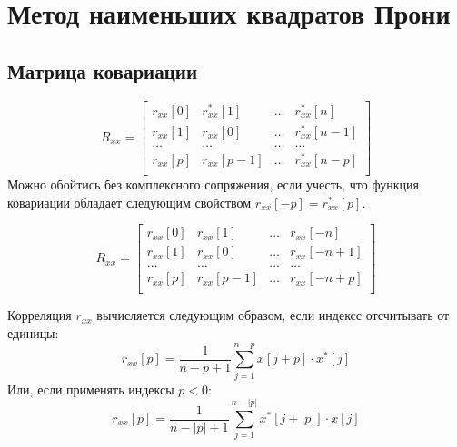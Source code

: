 \documentclass[a4paper,14pt]{extarticle}
\begin{document}
\section{Метод наименьших квадратов Прони}%
\label{sec:metod_naimen_shikh_kvadratov_proni}
\subsection{Матрица ковариации}%
\label{sub:matritsa_kovariatsii}

\begin{equation}
    \label{eq:Rxx1}
    R_{xx} = 
        \begin{bmatrix}
            r_{xx}[0] & r_{xx}^*[1] & \dots &  r_{xx}^*[n] \\
            r_{xx}[1] & r_{xx}[0] & \dots &  r_{xx}^*[n-1] \\
            \dots  & \dots    & \dots & \dots   \\ 
            r_{xx}[p] & r_{xx}[p-1] & \dots &  r_{xx}^*[n-p] \\
        \end{bmatrix}
\end{equation}
Можно обойтись без комплексного сопряжения, если учесть, что функция ковариации
обладает следующим свойством $r_{xx}[-p] = r_{xx}^*[p]$.

\begin{equation}
    \label{eq:Rxx2}
    R_{xx} = 
        \begin{bmatrix}
            r_{xx}[0] & r_{xx}[1] & \dots &  r_{xx}[-n] \\
            r_{xx}[1] & r_{xx}[0] & \dots &  r_{xx}[-n+1] \\
            \dots  & \dots    & \dots & \dots   \\ 
            r_{xx}[p] & r_{xx}[p-1] & \dots &  r_{xx}[-n+p] \\
        \end{bmatrix}
\end{equation}

Корреляция $r_{xx}$ вычисляется следующим образом, если индексс отсчитывать от
единицы:
\begin{equation}
    \label{eq:rxx1}
    r_{xx}[p] = \frac{1}{n-p+1} \sum\limits_{j=1}^{n-p} x[j+p] \cdot x^*[j]
\end{equation}
Или, если применять индексы $p<0$:
\begin{equation}
    \label{eq:rxx2}
    r_{xx}[p] = \frac{1}{n - |p| + 1} \sum\limits_{j=1}^{n-|p|} x^*[j+|p|] \cdot x[j]
\end{equation}
\end{document}
